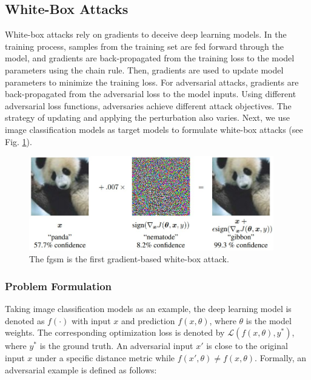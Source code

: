\subsection{White-Box Attacks}
\label{sec:whitebox_attack}

White-box attacks rely on gradients to deceive deep learning models. In the training process, samples from the training set are fed forward through the model, and gradients are back-propagated from the training loss to the model parameters using the chain rule. Then, gradients are used to update model parameters to minimize the training loss. For adversarial attacks, gradients are back-propagated from the adversarial loss to the model inputs. Using different adversarial loss functions, adversaries achieve different attack objectives. The strategy of updating and applying the perturbation also varies. Next, we use image classification models as target models to formulate white-box attacks (see Fig. \ref{fig.adv_perturb}).

\begin{figure}[H]
\centering
\includegraphics[width=0.95\textwidth]{figures/chapter_intro/fgsm.jpg}
\caption{The \acrfull{fgsm}\citep{GoodfellowSS14} is the first gradient-based white-box attack.}
\label{fig.adv_perturb}
\end{figure}

\subsubsection{Problem Formulation}

Taking image classification models as an example, the deep learning model is denoted as $f(\cdot)$ with input $x$ and prediction $f(x, \theta)$, where $\theta$ is the model weights. The corresponding optimization loss is denoted by $\mathcal{L}(f(x, \theta), y^*)$, where $y^*$ is the ground truth. An adversarial input $x'$ is close to the original input $x$ under a specific distance metric while $f(x', \theta) \neq f(x, \theta)$. Formally, an adversarial example is defined as follows:

